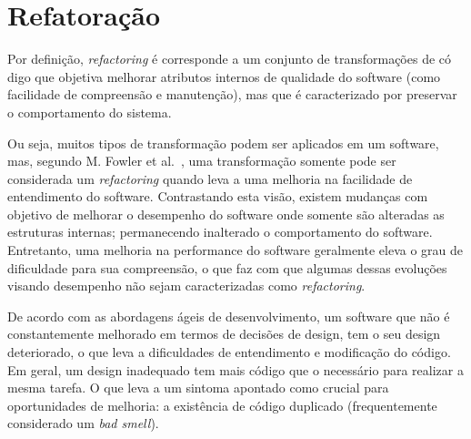 \section{Refatoração}\label{sec:refactoring}

Por definição, \textit{refactoring} é corresponde a 
um conjunto de transformações  
de có
digo que objetiva melhorar atributos internos de qualidade  
do software (como facilidade de compreensão e 
manutenção), mas que é caracterizado por preservar o comportamento do 
sistema. 

Ou seja, muitos tipos de transformação 
podem ser aplicados em um software, mas, segundo M. Fowler et al.~\cite{martinFowlerRafactoring}, 
uma transformação somente pode ser considerada um \textit{refactoring} quando 
leva a uma melhoria na facilidade de entendimento do software. 
Contrastando esta visão, existem mudanças com objetivo de melhorar o desempenho do 
software onde somente são alteradas as estruturas internas; permanecendo inalterado o comportamento do software. 
Entretanto, uma melhoria na performance do software geralmente eleva o grau de dificuldade para sua 
compreensão, o que faz com que algumas dessas evoluções visando desempenho não sejam 
caracterizadas como \textit{refactoring}.


De acordo com as abordagens ágeis de 
desenvolvimento, um software que não é constantemente melhorado em 
termos de decisões de design, tem o seu design deteriorado, 
o que leva a dificuldades de entendimento e modificação do código. 
Em geral, um design inadequado tem mais código 
que o necessário para realizar a mesma tarefa. O que leva a um sintoma apontado 
como crucial para oportunidades de melhoria: 
a existência de código duplicado (frequentemente considerado um 
\emph{bad smell}). 

